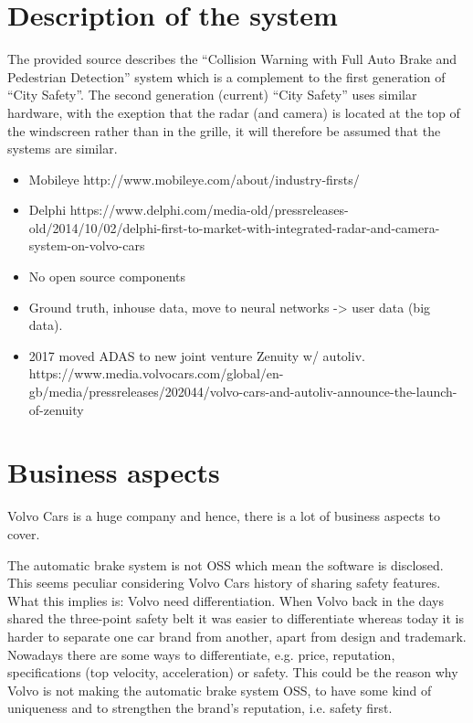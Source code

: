 \documentclass[conference]{IEEEtran}
\begin{document}

\section{Description of the system}
The provided source describes the ``Collision Warning with Full Auto Brake and Pedestrian Detection'' system which is a complement to the first generation of ``City Safety''. The second generation (current) ``City Safety'' uses similar hardware, with the exeption that the radar (and camera) is located at the top of the windscreen rather than in the grille, it will therefore be assumed that the systems are similar. \cite{SysDescription,RACam,DelphiVolvo}


\begin{itemize}
	\item Mobileye http://www.mobileye.com/about/industry-firsts/
	\item Delphi https://www.delphi.com/media-old/pressreleases-old/2014/10/02/delphi-first-to-market-with-integrated-radar-and-camera-system-on-volvo-cars
	\item No open source components
	\item Ground truth, inhouse data, move to neural networks -> user data (big data).
	\item 2017 moved ADAS to new joint venture Zenuity w/ autoliv. https://www.media.volvocars.com/global/en-gb/media/pressreleases/202044/volvo-cars-and-autoliv-announce-the-launch-of-zenuity
\end{itemize}
\section{Business aspects}
Volvo Cars is a huge company and hence, there is a lot of business aspects to cover.

The automatic brake system is not OSS which mean the software is disclosed. This seems peculiar considering Volvo Cars history of sharing safety features. What this implies is: Volvo need differentiation. When Volvo back in the days shared the three-point safety belt it was easier to differentiate whereas today it is harder to separate one car brand from another, apart from design and trademark. Nowadays there are some ways to differentiate, e.g. price, reputation, specifications (top velocity, acceleration) or safety. This could be the reason why Volvo is not making the automatic brake system OSS, to have some kind of uniqueness and to strengthen the brand's reputation, i.e. safety first. \cite{VolvoVision}
\end{document}
